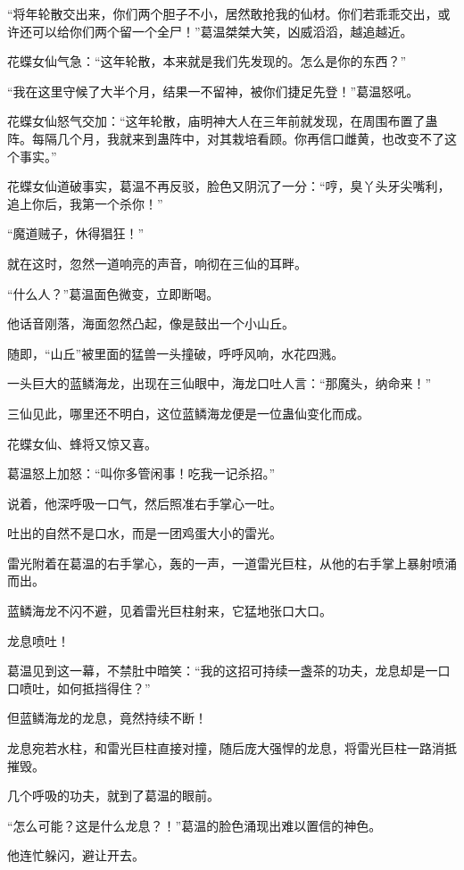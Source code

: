 \begin{this_body}
“将年轮散交出来，你们两个胆子不小，居然敢抢我的仙材。你们若乖乖交出，或许还可以给你们两个留一个全尸！”葛温桀桀大笑，凶威滔滔，越追越近。

花蝶女仙气急：“这年轮散，本来就是我们先发现的。怎么是你的东西？”

“我在这里守候了大半个月，结果一不留神，被你们捷足先登！”葛温怒吼。

花蝶女仙怒气交加：“这年轮散，庙明神大人在三年前就发现，在周围布置了蛊阵。每隔几个月，我就来到蛊阵中，对其栽培看顾。你再信口雌黄，也改变不了这个事实。”

花蝶女仙道破事实，葛温不再反驳，脸色又阴沉了一分：“哼，臭丫头牙尖嘴利，追上你后，我第一个杀你！”

“魔道贼子，休得猖狂！”

就在这时，忽然一道响亮的声音，响彻在三仙的耳畔。

“什么人？”葛温面色微变，立即断喝。

他话音刚落，海面忽然凸起，像是鼓出一个小山丘。

随即，“山丘”被里面的猛兽一头撞破，呼呼风响，水花四溅。

一头巨大的蓝鳞海龙，出现在三仙眼中，海龙口吐人言：“那魔头，纳命来！”

三仙见此，哪里还不明白，这位蓝鳞海龙便是一位蛊仙变化而成。

花蝶女仙、蜂将又惊又喜。

葛温怒上加怒：“叫你多管闲事！吃我一记杀招。”

说着，他深呼吸一口气，然后照准右手掌心一吐。

吐出的自然不是口水，而是一团鸡蛋大小的雷光。

雷光附着在葛温的右手掌心，轰的一声，一道雷光巨柱，从他的右手掌上暴射喷涌而出。

蓝鳞海龙不闪不避，见着雷光巨柱射来，它猛地张口大口。

龙息喷吐！

葛温见到这一幕，不禁肚中暗笑：“我的这招可持续一盏茶的功夫，龙息却是一口口喷吐，如何抵挡得住？”

但蓝鳞海龙的龙息，竟然持续不断！

龙息宛若水柱，和雷光巨柱直接对撞，随后庞大强悍的龙息，将雷光巨柱一路消抵摧毁。

几个呼吸的功夫，就到了葛温的眼前。

“怎么可能？这是什么龙息？！”葛温的脸色涌现出难以置信的神色。

他连忙躲闪，避让开去。


\end{this_body}

